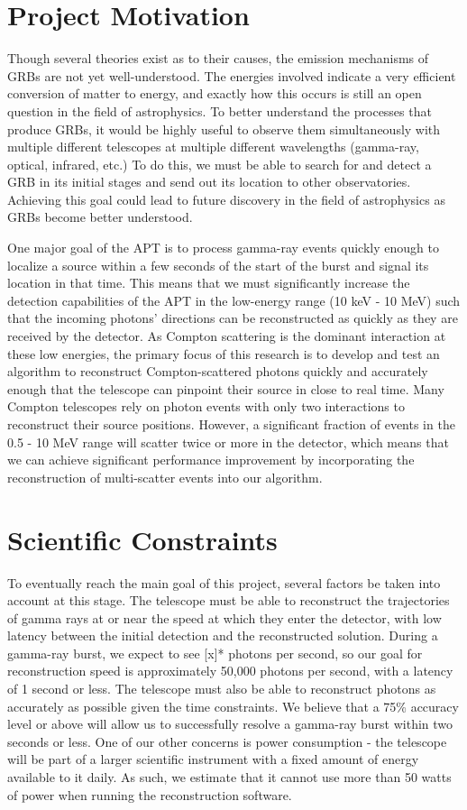 \section{Project Motivation}
Though several theories exist as to their causes, the emission mechanisms of GRBs are not yet well-understood. The energies involved indicate a very efficient conversion of matter to energy, and exactly how this occurs is still an open question in the field of astrophysics. To better understand the processes that produce GRBs, it would be highly useful to observe them simultaneously with multiple different telescopes at multiple different wavelengths (gamma-ray, optical, infrared, etc.) To do this, we must be able to search for and detect a GRB in its initial stages and send out its location to other observatories. Achieving this goal could lead to future discovery in the field of astrophysics as GRBs become better understood.

One major goal of the APT is to process gamma-ray events quickly enough to localize a source within a few seconds of the start of the burst and signal its location in that time. This means that we must significantly increase the detection capabilities of the APT in the low-energy range (10 keV - 10 MeV) such that the incoming photons' directions can be reconstructed as quickly as they are received by the detector. As Compton scattering is the dominant interaction at these low energies, the primary focus of this research is to develop and test an algorithm to reconstruct Compton-scattered photons quickly and accurately enough that the telescope can pinpoint their source in close to real time. Many Compton telescopes rely on photon events with only two interactions to reconstruct their source positions. However, a significant fraction of events in the 0.5 - 10 MeV range will scatter twice or more in the detector, which means that we can achieve significant performance improvement by incorporating the reconstruction of multi-scatter events into our algorithm.

\section{Scientific Constraints}

To eventually reach the main goal of this project, several factors be taken into account at this stage. The telescope must be able to reconstruct the trajectories of gamma rays at or near the speed at which they enter the detector, with low latency between the initial detection and the reconstructed solution. During a gamma-ray burst, we expect to see [x]* photons per second, so our goal for reconstruction speed is approximately 50,000 photons per second, with a latency of 1 second or less. The telescope must also be able to reconstruct photons as accurately as possible given the time constraints. We believe that a 75\% accuracy level or above will allow us to successfully resolve a gamma-ray burst within two seconds or less. One of our other concerns is power consumption - the telescope will be part of a larger scientific instrument with a fixed amount of energy available to it daily. As such, we estimate that it cannot use more than 50 watts of power when running the reconstruction software.

